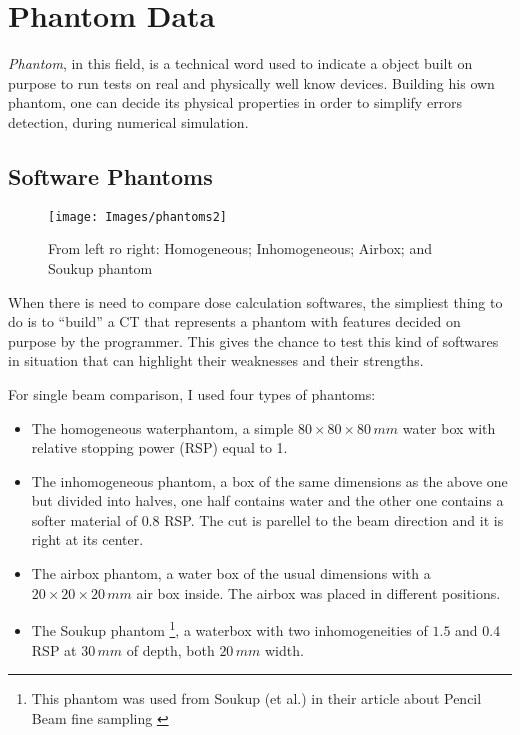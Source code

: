 \documentclass[12pt, a4paper, twoside]{book}
\begin{document}

\section{Phantom Data}\label{phantoms}
\emph{Phantom}, in this field, is a technical word used to indicate a object built on purpose to run tests on real and physically well know devices. Building his own phantom, one can decide its physical properties in order to simplify errors detection, during numerical simulation. 

\subsection{Software Phantoms}
\label{sec:pha}
\begin{figure}[h]
{\texttt{[image: Images/phantoms2]}}
\caption{From left ro right: Homogeneous; Inhomogeneous; Airbox; and Soukup phantom}
\label{fig:phantoms}
\end{figure}
When there is need to compare dose calculation softwares, the simpliest thing to do is to ``build'' a CT that represents a phantom with features decided on purpose by the programmer. This gives the chance to test this kind of softwares in situation that can highlight their weaknesses and their strengths.


For single beam comparison, I used four types of phantoms:
\begin{itemize}
\item The homogeneous waterphantom, a simple $80\times80\times80\,mm$ water box with relative stopping power (RSP) equal to 1.
\item The inhomogeneous phantom, a box of the same dimensions as the above one but divided into halves, one half contains water and the other one contains a softer material of $0.8$ RSP. The cut is parellel to the beam direction and it is right at its center.
\item The airbox phantom, a water box of the usual dimensions with a $20\times20\times20\,mm$ air box inside. The airbox was placed in different positions.
\item The Soukup phantom \footnote{This phantom was used from Soukup (et al.) in their article about Pencil Beam fine sampling \cite{souk:pba}}, a waterbox with two inhomogeneities of $1.5$ and $0.4$ RSP at $30\,mm$ of depth, both $20\,mm$ width.
\end{itemize}
\end{document}
